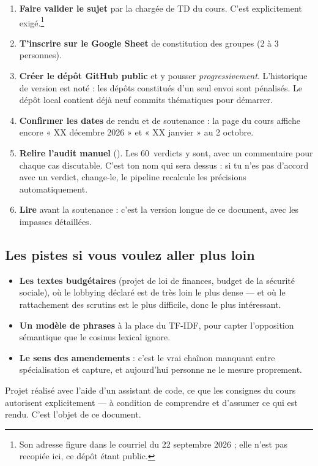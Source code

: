 \documentclass[11pt,a4paper]{article}
\begin{document}
\begin{enumerate}
\item \textbf{Faire valider le sujet} par la chargée de TD du cours. C'est
  explicitement exigé.\footnote{Son adresse figure dans le courriel du 22 septembre 2026 ;
  elle n'est pas recopiée ici, ce dépôt étant public.}
\item \textbf{T'inscrire sur le Google Sheet} de constitution des groupes (2 à 3 personnes).
\item \textbf{Créer le dépôt GitHub public} et y pousser \emph{progressivement}.
  L'historique de version est noté : les dépôts constitués d'un seul envoi sont pénalisés.
  Le dépôt local contient déjà neuf commits thématiques pour démarrer.
\item \textbf{Confirmer les dates} de rendu et de soutenance : la page du cours affiche
  encore « XX décembre 2026 » et « XX janvier » au 2 octobre.
\item \textbf{Relire l'audit manuel} ().
  Les 60~verdicts y sont, avec un commentaire pour chaque cas discutable. C'est ton nom qui
  sera dessus : si tu n'es pas d'accord avec un verdict, change-le, le pipeline recalcule
  les précisions automatiquement.
\item \textbf{Lire } avant la soutenance : c'est la version longue
  de ce document, avec les impasses détaillées.
\end{enumerate}

\subsection*{Les pistes si vous voulez aller plus loin}

\begin{itemize}
\item \textbf{Les textes budgétaires} (projet de loi de finances, budget de la sécurité
  sociale), où le lobbying déclaré est de très loin le plus dense --- et où le
  rattachement des scrutins est le plus difficile, donc le plus intéressant.
\item \textbf{Un modèle de phrases} à la place du TF-IDF, pour capter l'opposition
  sémantique que le cosinus lexical ignore.
\item \textbf{Le sens des amendements} : c'est le vrai chaînon manquant entre
  spécialisation et capture, et aujourd'hui personne ne le mesure proprement.
\end{itemize}

\vfill
\begin{center}
\color{cGris}\small
Projet réalisé avec l'aide d'un assistant de code, ce que les consignes du cours
autorisent explicitement --- à condition de comprendre et d'assumer ce qui est rendu.
C'est l'objet de ce document.
\end{center}
\end{document}
